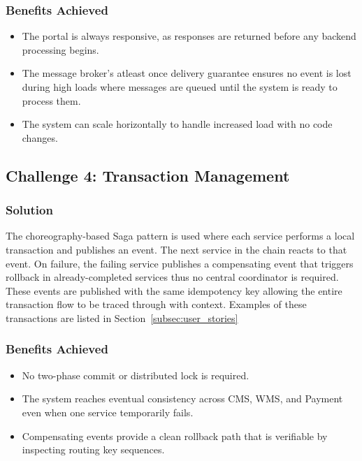 \subsubsection{Benefits Achieved}

\begin{itemize}
    \item The portal is always responsive, as responses are returned before any backend processing begins.
    \item The message broker's atleast once delivery guarantee ensures no event is lost during high loads where messages are queued until the system is ready to process them.
    \item The system can scale horizontally to handle increased load with no code changes.
\end{itemize}

\subsection{Challenge 4: Transaction Management}
\label{subsec:challenge4}

\subsubsection{Solution}

The choreography-based Saga pattern is used where each service performs a local transaction and publishes an event. The next service in the chain reacts to that event. On failure, the failing service publishes a compensating event that triggers rollback in already-completed services thus no central coordinator is required. These events are published with the same idempotency key allowing the entire transaction flow to be traced through with context. Examples of these transactions are listed in Section~\ref{subsec:user_stories}


\subsubsection{Benefits Achieved}

\begin{itemize}
    \item No two-phase commit or distributed lock is required.
    \item The system reaches eventual consistency across CMS, WMS, and Payment even when one service temporarily fails.
    \item Compensating events provide a clean rollback path that is verifiable by inspecting routing key sequences.
\end{itemize}

